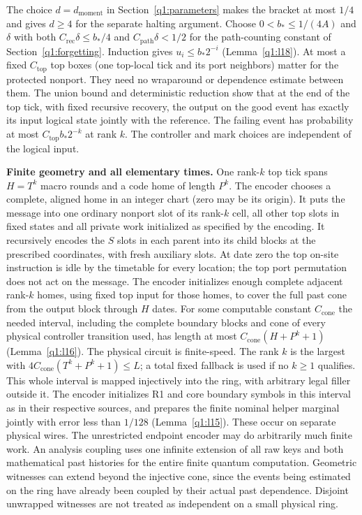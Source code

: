 The choice \(d=d_{\mathrm{moment}}\) in Section~\ref{q1:parameters}
makes the bracket at most \(1/4\) and gives \(d\ge4\) for the separate
halting argument.
Choose \(0<b_{*}\le 1/(4A)\) and \(\delta\) with both \(C_{\mathrm{rec}}\delta\le b_{*}/4\) and \(C_{\mathrm{path}} \delta<1/2\) for the path-counting constant of Section~\ref{q1:forgetting}. Induction gives \(u_{i}\le b_{*}2^{-i}\) (Lemma~\ref{q1:l18}). At most a fixed \(C_{\mathrm{top}}\) top boxes (one top-local tick and its port neighbors) matter for the protected nonport. They need no wraparound or dependence estimate between them. The union bound and deterministic reduction show that at the end of the top tick, with fixed recursive recovery, the output on the good event has exactly its input logical state jointly with the reference. The failing event has probability at most \(C_{\mathrm{top}} b_{*}2^{-k}\) at rank \(k\). The controller and mark choices are independent of the logical input.

\textbf{Finite geometry and all elementary times.} One rank-\(k\) top tick spans \(H=T^{k}\) macro rounds and a code home of length \(P^{k}\). The encoder chooses a complete, aligned home in an integer chart (zero may be its origin). It puts the message into one ordinary nonport slot of its rank-\(k\) cell, all other top slots in fixed states and all private work initialized as specified by the encoding. It recursively encodes the \(S\) slots in each parent into its child blocks at the prescribed coordinates, with fresh auxiliary slots. At date zero the top on-site instruction is idle by the timetable for every location; the top port permutation does not act on the message. The encoder initializes enough complete adjacent rank-\(k\) homes, using fixed top input for those homes, to cover the full past cone from the output block through \(H\) dates. For some computable constant \(C_{\mathrm{cone}}\) the needed interval, including the complete boundary blocks and cone of every physical controller transition used, has length at most \(C_{\mathrm{cone}}(H+P^{k}+1)\) (Lemma~\ref{q1:l16}). The physical circuit is finite-speed. The rank \(k\) is the largest with \(4 C_{\mathrm{cone}}(T^{k}+P^{k}+1)\le L\); a total fixed fallback is used if no \(k\ge 1\) qualifies. This whole interval is mapped injectively into the ring, with arbitrary legal filler outside it. The encoder initializes R1 and core boundary symbols in this interval as in their respective sources, and prepares the finite nominal helper marginal jointly with error less than \(1/128\) (Lemma~\ref{q1:l15}). These occur on separate physical wires. The unrestricted endpoint encoder may do arbitrarily much finite work. An analysis coupling uses one infinite extension of all raw keys and both mathematical past histories for the entire finite quantum computation. Geometric witnesses can extend beyond the injective cone, since the events being estimated on the ring have already been coupled by their actual past dependence. Disjoint unwrapped witnesses are not treated as independent on a small physical ring.

